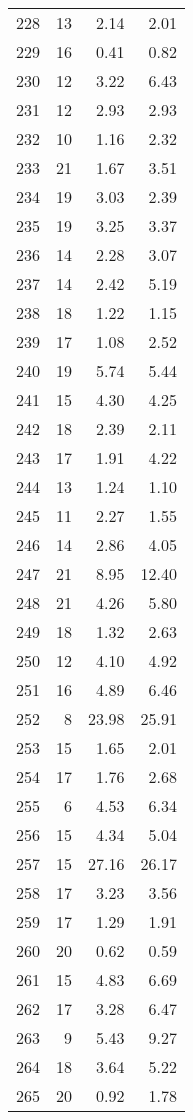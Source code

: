 \begin{longtable}{c r r r}
  228 & 13  & 2.14 & 2.01 \\ 
  229 & 16  & 0.41 & 0.82 \\ 
  230 & 12  & 3.22 & 6.43 \\ 
  231 & 12  & 2.93 & 2.93 \\ 
  232 & 10  & 1.16 & 2.32 \\ 
  233 & 21  & 1.67 & 3.51 \\ 
  234 & 19  & 3.03 & 2.39 \\ 
  235 & 19  & 3.25 & 3.37 \\ 
  236 & 14  & 2.28 & 3.07 \\ 
  237 & 14  & 2.42 & 5.19 \\ 
  238 & 18  & 1.22 & 1.15 \\ 
  239 & 17  & 1.08 & 2.52 \\ 
  240 & 19  & 5.74 & 5.44 \\ 
  241 & 15  & 4.30 & 4.25 \\ 
  242 & 18  & 2.39 & 2.11 \\ 
  243 & 17  & 1.91 & 4.22 \\ 
  244 & 13  & 1.24 & 1.10 \\ 
  245 & 11  & 2.27 & 1.55 \\ 
  246 & 14  & 2.86 & 4.05 \\ 
  247 & 21  & 8.95 & 12.40 \\ 
  248 & 21  & 4.26 & 5.80 \\ 
  249 & 18  & 1.32 & 2.63 \\ 
  250 & 12  & 4.10 & 4.92 \\ 
  251 & 16  & 4.89 & 6.46 \\ 
  252 & 8  & 23.98 & 25.91 \\ 
  253 & 15  & 1.65 & 2.01 \\ 
  254 & 17  & 1.76 & 2.68 \\ 
  255 & 6  & 4.53 & 6.34 \\ 
  256 & 15  & 4.34 & 5.04 \\ 
  257 & 15  & 27.16 & 26.17 \\ 
  258 & 17  & 3.23 & 3.56 \\ 
  259 & 17  & 1.29 & 1.91 \\ 
  260 & 20  & 0.62 & 0.59 \\ 
  261 & 15  & 4.83 & 6.69 \\ 
  262 & 17  & 3.28 & 6.47 \\ 
  263 & 9  & 5.43 & 9.27 \\ 
  264 & 18  & 3.64 & 5.22 \\ 
  265 & 20  & 0.92 & 1.78 \\ 

\end{longtable}
